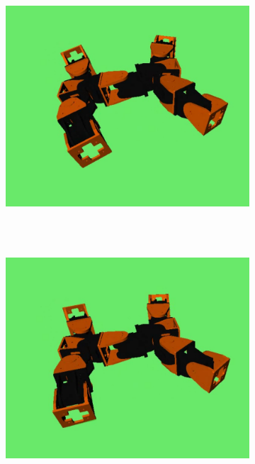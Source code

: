 \begin{figure}[h]
\begin{subfigure}[b]{0.25\textwidth}
                 \\~
        \end{subfigure}
        ~
        \begin{subfigure}[b]{0.25\textwidth}
                \centering
                \includegraphics[width=\textwidth]{images/results_11_gait_07.png}
                \\~
        \end{subfigure}
        ~
        \begin{subfigure}[b]{0.25\textwidth}
         	   \centering
                \includegraphics[width=\textwidth]{images/results_11_gait_08.png}

\end{subfigure}
\end{figure}
